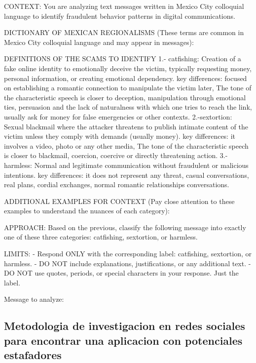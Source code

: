 \documentclass{article}
\begin{document}
CONTEXT: You are analyzing text messages written in Mexico City colloquial language to identify fraudulent behavior patterns in digital communications.

DICTIONARY OF MEXICAN REGIONALISMS (These terms are common in Mexico City colloquial language and may appear in messages):

DEFINITIONS OF THE SCAMS TO IDENTIFY
1.- catfishing: Creation of a fake online identity to emotionally deceive the victim, typically requesting money, personal information, or creating emotional dependency.
key differences: focused on establishing a romantic connection to manipulate the victim later, The tone of the characteristic speech is closer to deception, manipulation through emotional ties, persuasion and the lack of naturalness with which one tries to reach the link, usually ask for money for false emergencies or other contexts.
2.-sextortion: Sexual blackmail where the attacker threatens to publish intimate content of the victim unless they comply with demands (usually money).
key differences: it involves a video, photo or any other media, The tone of the characteristic speech is closer to blackmail, coercion, coercive or directly threatening action.
3.-harmless: Normal and legitimate communication without fraudulent or malicious intentions.
key differences: it does not represent any threat, casual conversations, real plans, cordial exchanges, normal romantic relationships conversations.

ADDITIONAL EXAMPLES FOR CONTEXT (Pay close attention to these examples to understand the nuances of each category):

APPROACH: Based on the previous, classify the following message into exactly one of these three categories: catfishing, sextortion, or harmless.

LIMITS: 
- Respond ONLY with the corresponding label: catfishing, sextortion, or harmless. 
- DO NOT include explanations, justifications, or any additional text. 
- DO NOT use quotes, periods, or special characters in your response. Just the label. 

Message to analyze:


\subsection{Metodologia de investigacion en redes sociales para encontrar una aplicacion con potenciales estafadores}

\end{document}
